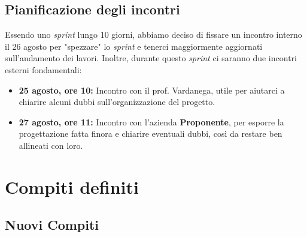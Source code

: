 \documentclass[12pt, a4paper]{article}
\begin{document}
\subsection{Pianificazione degli incontri}
Essendo uno \textit{sprint} lungo 10 giorni, abbiamo deciso di fissare un incontro interno il 26 agosto per "spezzare" lo \textit{sprint} e tenerci maggiormente aggiornati sull'andamento dei lavori. 
Inoltre, durante questo \textit{sprint} ci saranno due incontri esterni fondamentali:
\begin{itemize}
    \item \textbf{25 agosto, ore 10:} Incontro con il prof. Vardanega, utile per aiutarci a chiarire alcuni dubbi sull'organizzazione del progetto.
    \item \textbf{27 agosto, ore 11:} Incontro con l'azienda \textbf{Proponente}, per esporre la progettazione fatta finora e chiarire eventuali dubbi, così da restare ben allineati con loro.
\end{itemize}

\newpage
\section{Compiti definiti} 

\subsection{Nuovi Compiti}
\end{document}
